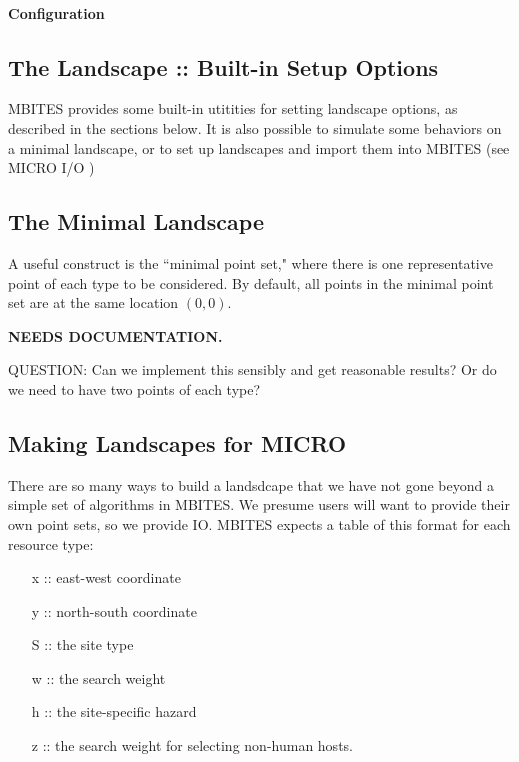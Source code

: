 \documentclass{article}
\newcommand{\ND}{{\bf NEEDS DOCUMENTATION.}}
\begin{document}
\paragraph{Configuration}


\subsection{The Landscape :: Built-in Setup Options}

MBITES provides some built-in utitities for setting landscape options, as described in the sections below. It is also possible to simulate some behaviors on a minimal landscape, or to set up landscapes and import them into MBITES (see MICRO I/O )

\subsection{The Minimal Landscape}

A useful construct is the ``minimal point set," where there is one representative point of each type to be considered. By default, all points in the minimal point set are at the same location $(0,0)$. 

\ND 

QUESTION: Can we implement this sensibly and get reasonable results? Or do we need to have two points of each type? 

\subsection{Making Landscapes for MICRO}

There are so many ways to build a landsdcape that we have not gone beyond a simple set of algorithms in MBITES. We presume users will want to provide their own point sets, so we provide IO. MBITES expects a table of this format for each resource type: 

\begin{itemize}
\item [x] :: east-west coordinate
\item [y] :: north-south coordinate
\item [S] :: the site type
\item [w] :: the search weight
\item [h] :: the site-specific hazard
\item [z] :: the search weight for selecting non-human hosts. 
\end{itemize} 
\end{document}
